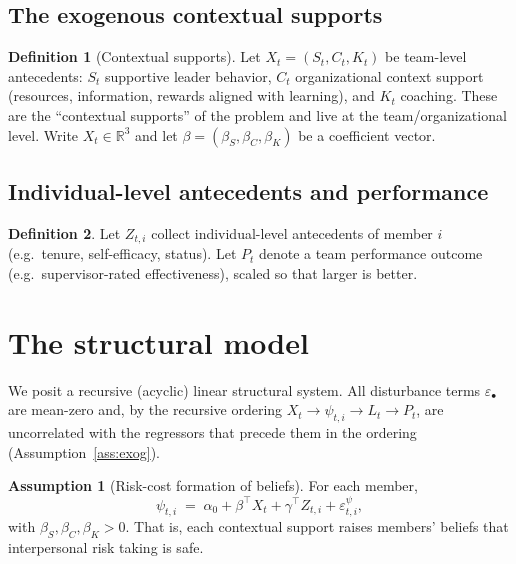 \documentclass{amsart}
\theoremstyle{definition}
\newtheorem{definition}{Definition}
\newtheorem{assumption}{Assumption}
\theoremstyle{remark}
\begin{document}
\subsection{The exogenous contextual supports}
\begin{definition}[Contextual supports]\label{def:X}
Let $X_t=(S_t,C_t,K_t)$ be team-level antecedents:
$S_t$ supportive leader behavior, $C_t$ organizational context support
(resources, information, rewards aligned with learning), and $K_t$
coaching. These are the ``contextual supports'' of the problem and live at
the team/organizational level. Write $X_t\in\mathbb{R}^3$ and let
$\beta=(\beta_S,\beta_C,\beta_K)$ be a coefficient vector.
\end{definition}

\subsection{Individual-level antecedents and performance}
\begin{definition}\label{def:Z}
Let $Z_{t,i}$ collect individual-level antecedents of member $i$
(e.g.\ tenure, self-efficacy, status). Let $P_t$ denote a team
performance outcome (e.g.\ supervisor-rated effectiveness), scaled so that
larger is better.
\end{definition}

\section{The structural model}

We posit a recursive (acyclic) linear structural system. All disturbance
terms $\varepsilon_\bullet$ are mean-zero and, by the recursive ordering
$X_t\to \psi_{t,i}\to L_t\to P_t$, are uncorrelated with the regressors
that precede them in the ordering (Assumption~\ref{ass:exog}).

\begin{assumption}[Risk-cost formation of beliefs]\label{ass:safety}
For each member,
\begin{equation}\label{eq:psi}
\psi_{t,i} \;=\; \alpha_0 + \beta^{\top} X_t + \gamma^{\top} Z_{t,i}
             + \varepsilon^{\psi}_{t,i},
\end{equation}
with $\beta_S,\beta_C,\beta_K>0$. That is, each contextual support
raises members' beliefs that interpersonal risk taking is safe.
\end{assumption}
\end{document}
